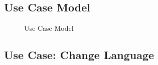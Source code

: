 \documentclass[a4paper,12pt]{report}
\begin{document}
\subsection{Use Case Model}
\begin{figure}[!htb]
	\caption{\label{fig:uc_use_case_model} Use Case Model}	
\end{figure}


\FloatBarrier
\subsection{Use Case: Change Language}
 
\end{document}
